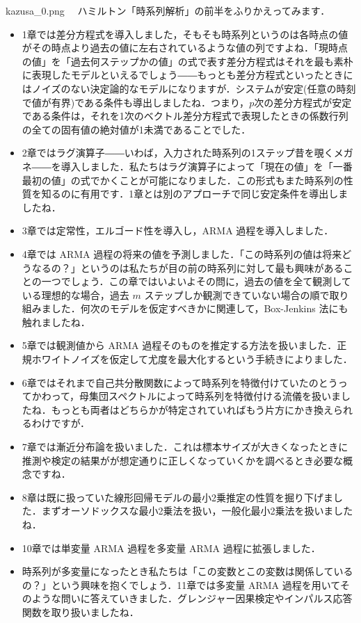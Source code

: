 \documentclass[b5paper,xelatex,ja=standard,10pt]{bxjsarticle}
\begin{document}
\begin{SERIFU}[colback=PaleIris]{kazusa_0.png}
　ハミルトン「時系列解析」\cite{hamilton1994}の前半をふりかえってみます．
\vspace{-0.3\baselineskip}
\begin{itemize}
  \item 1章では差分方程式を導入しました，そもそも時系列というのは各時点の値がその時点より過去の値に左右されているような値の列ですよね．「現時点の値」を「過去何ステップかの値」の式で表す差分方程式はそれを最も素朴に表現したモデルといえるでしょう――もっとも差分方程式といったときにはノイズのない決定論的なモデルになりますが．システムが安定(任意の時刻で値が有界)である条件も導出しましたね．つまり，$p$次の差分方程式が安定である条件は，それを1次のベクトル差分方程式で表現したときの係数行列の全ての固有値の絶対値が1未満であることでした．
  \item 2章ではラグ演算子――いわば，入力された時系列の1ステップ昔を覗くメガネ――を導入しました．私たちはラグ演算子によって「現在の値」を「一番最初の値」の式でかくことが可能になりました．この形式もまた時系列の性質を知るのに有用です．1章とは別のアプローチで同じ安定条件を導出しましたね．
  \item 3章では定常性，エルゴード性を導入し，ARMA 過程を導入しました．
  \item 4章では ARMA 過程の将来の値を予測しました．{「この時系列の値は将来どうなるの？」}というのは私たちが目の前の時系列に対して最も興味があることの一つでしょう．この章ではいよいよその問に，過去の値を全て観測している理想的な場合，過去 $m$ ステップしか観測できていない場合の順で取り組みました．何次のモデルを仮定すべきかに関連して，Box-Jenkins 法にも触れましたね．
  \item 5章では観測値から ARMA 過程そのものを推定する方法を扱いました．正規ホワイトノイズを仮定して尤度を最大化するという手続きによりました．
  \item 6章ではそれまで自己共分散関数によって時系列を特徴付けていたのとうってかわって，母集団スペクトルによって時系列を特徴付ける流儀を扱いましたね．もっとも両者はどちらかが特定されていればもう片方にかき換えられるわけですが．
  \item 7章では漸近分布論を扱いました．これは標本サイズが大きくなったときに推測や検定の結果がが想定通りに正しくなっていくかを調べるとき必要な概念ですね．
  \item 8章は既に扱っていた線形回帰モデルの最小2乗推定の性質を掘り下げました．まずオーソドックスな最小2乗法を扱い，一般化最小2乗法を扱いましたね．
  \item 10章では単変量 ARMA 過程を多変量 ARMA 過程に拡張しました．
  \item 時系列が多変量になったとき私たちは{「この変数とこの変数は関係しているの？」}という興味を抱くでしょう．11章では多変量 ARMA 過程を用いてそのような問いに答えていきました．グレンジャー因果検定やインパルス応答関数を取り扱いましたね．
 \end{itemize}
\end{SERIFU}
\end{document}
